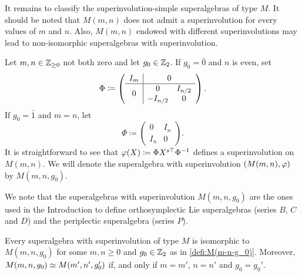 It remains to classify the superinvolution-simple superalgebras of type $M$. 
It should be noted that $M(m,n)$ does not admit a superinvolution for every values of $m$ and $n$. 
Also, $M(m,n)$ endowed with different superinvolutions may lead to non-isomorphic superalgebras with superinvolution. 

\begin{defi}\label{defi:M(m-n-g_0)}
    Let $m,n \in \mathbb{Z}_{\geq 0}$ not both zero and let $g_0 \in \mathbb{Z}_2$. 
    If $g_0 = \bar 0$ and $n$ is even, set 
    \[
        \sbox0{$\begin{matrix} 0& I_{n/2}\\ -I_{n/2}& 0\end{matrix}$}
        \Phi \coloneqq \left(\begin{array}{c|c}
                    I_m & 0\\
                    \hline
                    0 & \usebox{0}
                \end{array}\right).
    \]
    If $g_0 = \bar 1$ and $m = n$, let
    \[
        \Phi \coloneqq \left(\begin{array}{c|c}
                    0 & I_n\\
                    \hline 
                    I_n & 0
                \end{array}\right).
    \]
    It is straightforward to see that $\varphi(X) \coloneqq \Phi X^{s\top} \Phi^{-1}$ defines a superinvolution on $M(m,n)$. 
    We will denote the superalgebra with superinvolution $(M(m,n), \varphi)$ by $M(m,n, g_0)$. 
\end{defi}

We note that the superalgebras with superinvolution $M(m,n,g_0)$ are the ones used in the Introduction to define orthosymplectic Lie superalgebras (series $B$, $C$ and $D$) and the periplectic superalgebra (series $P$).

\begin{prop}\label{prop:iso-M-with-vphi}
    Every superalgebra with superinvolution of type $M$ is isomorphic to $M(m,n, g_0)$ for some $m,n \geq 0$ and $g_0 \in \mathbb{Z}_2$ as in \cref{defi:M(m-n-g_0)}. 
    Moreover, $M(m,n, g_0) \simeq M(m',n', g_0')$ if, and only if $m = m'$, $n = n'$ and $g_0 = g_0'$.
\end{prop}

